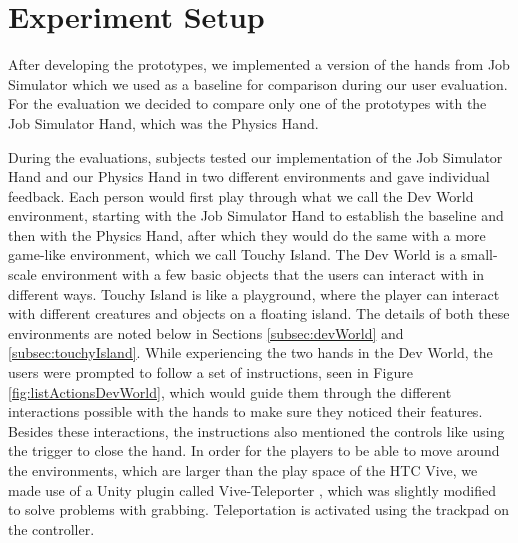 \section{Experiment Setup}
\label{sec:experimentSetup}
After developing the prototypes, we implemented a version of the hands from Job Simulator which we used as a baseline for comparison during our user evaluation. For the evaluation we decided to compare only one of the prototypes with the Job Simulator Hand, which was the Physics Hand.

During the evaluations, subjects tested our implementation of the Job Simulator Hand and our Physics Hand in two different environments and gave individual feedback. Each person would first play through what we call the Dev World environment, starting with the Job Simulator Hand to establish the baseline and then with the Physics Hand, after which they would do the same with a more game-like environment, which we call Touchy Island. The Dev World is a small-scale environment with a few basic objects that the users can interact with in different ways. Touchy Island is like a playground, where the player can interact with different creatures and objects on a floating island. The details of both these environments are noted below in Sections \ref{subsec:devWorld} and \ref{subsec:touchyIsland}. While experiencing the two hands in the Dev World, the users were prompted to follow a set of instructions, seen in Figure \ref{fig:listActionsDevWorld}, which would guide them through the different interactions possible with the hands to make sure they noticed their features. Besides these interactions, the instructions also mentioned the controls like using the trigger to close the hand. In order for the players to be able to move around the environments, which are larger than the play space of the HTC Vive, we made use of a Unity plugin called Vive-Teleporter \parencite{Biagioli2016}, which was slightly modified to solve problems with grabbing. Teleportation is activated using the trackpad on the controller.

